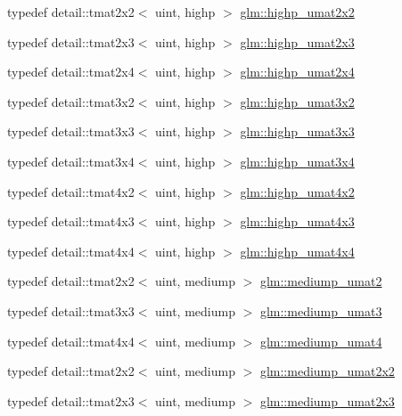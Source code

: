 \begin{CompactItemize}
\item 
typedef detail::tmat2x2$<$ uint, highp $>$ \hyperlink{group__gtc__matrix__integer_g428410468e33d16dc8aee08b17166669}{glm::highp\_\-umat2x2}
\item 
typedef detail::tmat2x3$<$ uint, highp $>$ \hyperlink{group__gtc__matrix__integer_g309076d055b5511a7071ebb5f660ed83}{glm::highp\_\-umat2x3}
\item 
typedef detail::tmat2x4$<$ uint, highp $>$ \hyperlink{group__gtc__matrix__integer_gbe8572c228aecc0bfa7ba92415b1c651}{glm::highp\_\-umat2x4}
\item 
typedef detail::tmat3x2$<$ uint, highp $>$ \hyperlink{group__gtc__matrix__integer_g6f6a73ec605a515fb21d779663082ef9}{glm::highp\_\-umat3x2}
\item 
typedef detail::tmat3x3$<$ uint, highp $>$ \hyperlink{group__gtc__matrix__integer_g8dd9f8bfe06de34c8f1a942d2c2e094c}{glm::highp\_\-umat3x3}
\item 
typedef detail::tmat3x4$<$ uint, highp $>$ \hyperlink{group__gtc__matrix__integer_gbaeb2363acd07cc7f99918bae48ccc05}{glm::highp\_\-umat3x4}
\item 
typedef detail::tmat4x2$<$ uint, highp $>$ \hyperlink{group__gtc__matrix__integer_g32442efcb778cb80024a17bafa781f81}{glm::highp\_\-umat4x2}
\item 
typedef detail::tmat4x3$<$ uint, highp $>$ \hyperlink{group__gtc__matrix__integer_g763a36c57b6073ca3cac739bfbe794ba}{glm::highp\_\-umat4x3}
\item 
typedef detail::tmat4x4$<$ uint, highp $>$ \hyperlink{group__gtc__matrix__integer_ga14b7029cfaf6f26384782f5ff7acddf}{glm::highp\_\-umat4x4}
\item 
typedef detail::tmat2x2$<$ uint, mediump $>$ \hyperlink{group__gtc__matrix__integer_g388a5b9d7e494d5f5bd30b9e11ded06a}{glm::mediump\_\-umat2}
\item 
typedef detail::tmat3x3$<$ uint, mediump $>$ \hyperlink{group__gtc__matrix__integer_g123f7d8bac8849e3a150bdf8a21e44a2}{glm::mediump\_\-umat3}
\item 
typedef detail::tmat4x4$<$ uint, mediump $>$ \hyperlink{group__gtc__matrix__integer_gc82f1c426fbca1c4989f0985eb7a4358}{glm::mediump\_\-umat4}
\item 
typedef detail::tmat2x2$<$ uint, mediump $>$ \hyperlink{group__gtc__matrix__integer_g80e478f09c6caa16410198ce78fe8a2b}{glm::mediump\_\-umat2x2}
\item 
typedef detail::tmat2x3$<$ uint, mediump $>$ \hyperlink{group__gtc__matrix__integer_gaae45c5dbaad1ecd57bfa936d851be1b}{glm::mediump\_\-umat2x3}

\end{CompactItemize}

